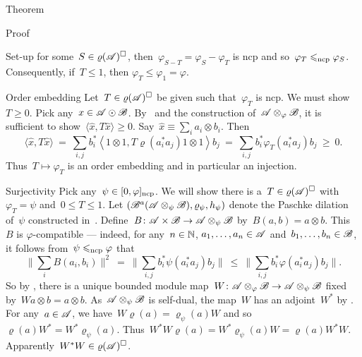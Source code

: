 \documentclass[b]{subfiles}
\begin{document}
\begin{parsec}
\begin{point}{Theorem}
\begin{point}{Proof}
\begin{point}{Set-up}
    for some~$S \in \varrho(\mathscr{A})^\square$,
    then~$\varphi_{S-T} = \varphi_S - \varphi_T$ is ncp
    and so~$\varphi_T \mathrel{\leqslant_{\mathrm{ncp}}} \varphi_S$.
Consequently, if~$T\leq 1$, then $\varphi_T \leq \varphi_1 = \varphi$.
\end{point}
\begin{point}{Order embedding}%
Let~$T \in \varrho(\mathscr{A})^\square$
    be given such that~$\varphi_T$ is ncp.
We must show~$T \geq 0$.
Pick any~$x \in \mathscr{A} \odot \mathscr{B}$.
By~ and
    the construction of~$\mathscr{A} \otimes_\varphi \mathscr{B}$,
    it is sufficient to show~$\langle \hat{x}, T \hat{x}\rangle \geq 0$.
Say~$\hat{x} \equiv \sum_i a_i \otimes b_i$.
Then
\begin{equation*}
    \langle\hat{x}, T \hat{x} \rangle
    \ =\  \sum_{i,j} b_i^* \left< 1\otimes 1, T \varrho(a_i^*a_j) 1 \otimes 1\right> b_j
    \ = \ \sum_{i,j} b_i^* \varphi_T (a_i^*a_j) b_j \ \geq\  0.
\end{equation*}
Thus~$T \mapsto \varphi_T$ is an order embedding
    and in particular an injection.
\end{point}
\begin{point}{Surjectivity}%
Pick any~$\psi \in [0,\varphi]_{\mathrm{ncp}}$.
We will show there is a~$T \in \varrho(\mathscr{A})^\square$
    with~$\varphi_T = \psi$ and~$0 \leq T \leq 1$.
Let $(\mathscr{B}^a(\mathscr{A} \otimes_\psi \mathscr{B}),
    \varrho_\psi, h_\psi)$ denote the Paschke dilation of~$\psi$
    constructed in~.
Define~$B\colon \mathscr{A} \times \mathscr{B} \to \mathscr{A} \otimes_\psi \mathscr{B}$
    by~$B(a,b) = a \otimes b$.
This~$B$ is $\varphi$-compatible
--- indeed, for any~$n \in \mathbb{N}$, $a_1, \ldots, a_n \in \mathscr{A}$
    and~$b_1, \ldots, b_n \in \mathscr{B}$,
    it follows from~$\psi \mathrel{\leqslant_{\mathrm{ncp}}} \varphi$ that
\begin{equation*}
    \bigl\| \sum_i B(a_i, b_i) \bigr\|^2
     \ = \  \bigl\| \sum_{i,j}
                b_i^* \psi(a_i^*a_j) b_j \bigr\|
     \ \leq \  \bigl\| \sum_{i,j}
                b_i^* \varphi(a_i^*a_j) b_j \bigr\|.
\end{equation*}
So by ,
    there is a unique bounded module
    map~$W \colon \mathscr{A} \otimes_\varphi \mathscr{B} \to \mathscr{A} \otimes_\psi \mathscr{B}$
    fixed by~$W a \otimes b = a \otimes b$.
As~$\mathscr{A} \otimes_\psi \mathscr{B}$ is self-dual,
    the map~$W$ has an adjoint~$W^*$ by .
For any~$a\in\mathscr{A}$, we have~$W \varrho(a) = \varrho_\psi(a) W$
and so~$\varrho(a) W^* = W^* \varrho_\psi(a)$.
Thus~$W^*W \varrho(a) = W^* \varrho_\psi(a) W = \varrho(a) W^*W$.
Apparently~$W^*W \in \varrho(\mathscr{A})^\square$.

\end{point}
\end{point}
\end{point}
\end{parsec}
\end{document}
